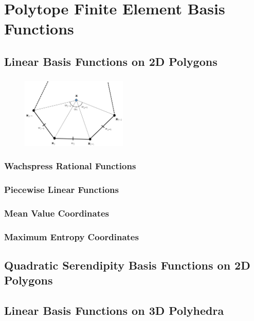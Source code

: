 \documentclass[]{beamer}
\begin{document}
\section[POLYFEM]{Polytope Finite Element Basis Functions}
\subsection{Linear Basis Functions on 2D Polygons}
\begin{frame}[t]\frametitle{}
\begin{figure}[t]
\centering
\includegraphics[width=0.45\textwidth]{images/ref_polygon.png}
\end{figure}
\end{frame}
\begin{frame}[t]\frametitle{Wachspress Rational Functions}

\end{frame}
\begin{frame}[t]\frametitle{Piecewise Linear Functions}

\end{frame}
\begin{frame}[t]\frametitle{Mean Value Coordinates}

\end{frame}
\begin{frame}[t]\frametitle{Maximum Entropy Coordinates}

\end{frame}
\subsection{Quadratic Serendipity Basis Functions on 2D Polygons}
\begin{frame}[t]\frametitle{}

\end{frame}
\subsection{Linear Basis Functions on 3D Polyhedra}
\begin{frame}[t]\frametitle{}

\end{frame}
\end{document}
